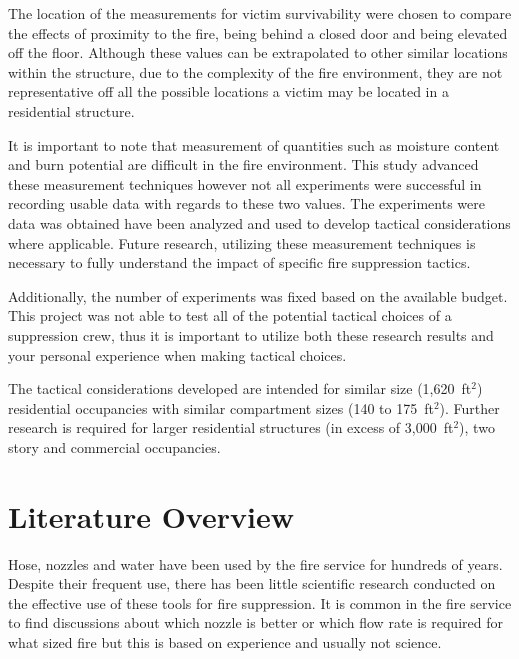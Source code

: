\documentclass[12pt,oneside]{book}
\begin{document}
The location of the measurements for victim survivability were chosen to compare the effects of proximity to the fire, being behind a closed door and being elevated off the floor. Although these values can be extrapolated to other similar locations within the structure, due to the complexity of the fire environment, they are not representative off all the possible locations a victim may be located in a residential structure.  

It is important to note that measurement of quantities such as moisture content and burn potential are difficult in the fire environment. This study advanced these measurement techniques however not all experiments were successful in recording usable data with regards to these two values. The experiments were data was obtained have been analyzed and used to develop tactical considerations where applicable. Future research, utilizing these measurement techniques is necessary to fully understand the impact of specific fire suppression tactics. 

Additionally, the number of experiments was fixed based on the available budget. This project was not able to test all of the potential tactical choices of a suppression crew, thus it is important to utilize both these research results and your personal experience when making tactical choices.  

The tactical considerations developed are intended for similar size (1,620~ft$^2$) residential occupancies with similar compartment sizes (140 to 175~ft$^2$). Further research is required for larger residential structures (in excess of 3,000~ft$^2$), two story and commercial occupancies.

\clearpage

\chapter{Literature Overview}

Hose, nozzles and water have been used by the fire service for hundreds of years. Despite their frequent use, there has been little scientific research conducted on the effective use of these tools for fire suppression. It is common in the fire service to find discussions about which nozzle is better or which flow rate is required for what sized fire but this is based on experience and usually not science. 

\end{document}
